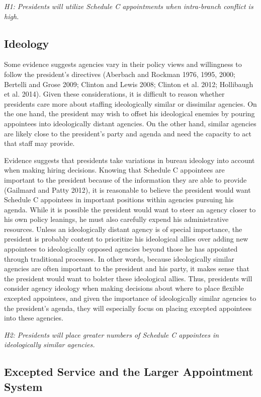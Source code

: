 \documentclass[12pt]{article}
\begin{document}
\textit{H1: Presidents will utilize Schedule C appointments when intra-branch conflict is high.}

\subsection*{Ideology}

Some evidence suggests agencies vary in their policy views and willingness to follow the president's directives (Aberbach and Rockman 1976, 1995, 2000; Bertelli and Grose 2009; Clinton and Lewis 2008; Clinton et al. 2012; Hollibaugh et al. 2014). Given these considerations, it is difficult to reason whether presidents care more about staffing ideologically similar or dissimilar agencies. On the one hand, the president may wish to offset his ideological enemies by pouring appointees into ideologically distant agencies. On the other hand, similar agencies are likely close to the president's party and agenda and need the capacity to act that staff may provide.

Evidence suggests that presidents take variations in bureau ideology into account when making hiring decisions. Knowing that Schedule C appointees are important to the president because of the information they are able to provide (Gailmard and Patty 2012), it is reasonable to believe the president would want Schedule C appointees in important positions within agencies pursuing his agenda. While it is possible the president would want to steer an agency closer to his own policy leanings, he must also carefully expend his administrative resources. Unless an ideologically distant agency is of special importance, the president is probably content to prioritize his ideological allies over adding new appointees to ideologically opposed agencies beyond those he has appointed through traditional processes. In other words, because ideologically similar agencies are often important to the president and his party, it makes sense that the president would want to bolster these ideological allies. Thus, presidents will consider agency ideology when making decisions about where to place flexible excepted appointees, and given the importance of ideologically similar agencies to the president's agenda, they will especially focus on placing excepted appointees into these agencies.

\textit{H2: Presidents will place greater numbers of Schedule C appointees in ideologically similar agencies.}

\subsection*{Excepted Service and the Larger Appointment System}
\end{document}
